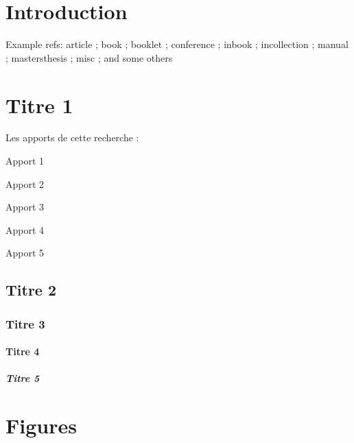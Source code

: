 \documentclass{article}
\begin{document}
\section{Introduction}

Example refs:
article \citep{article} ;
book \citep{book} ;
booklet \citep{booklet} ;
conference \citep{conference} ;
inbook \citep{inbook} ;
incollection \citep{incollection} ;
manual \citep{manual} ;
mastersthesis \citep{mastersthesis} ;
misc \citep{misc} ;
and some others \citep{phdthesis,proceedings,techreport,unpublished}

\lipsum[1]

\section{Titre 1}

\lipsum[2]

\begin{checklist}{Les apports de cette recherche :}
  \item Apport 1
  \item Apport 2
  \item Apport 3
  \item Apport 4
  \item Apport 5
\end{checklist}

\subsection{Titre 2}

\lipsum[3]

\subsubsection{Titre 3}

\lipsum[4]

\paragraph{Titre 4}

\lipsum[5]

\subparagraph{Titre 5}

\lipsum[6]

\section{Figures}

\lipsum[7]
\end{document}

